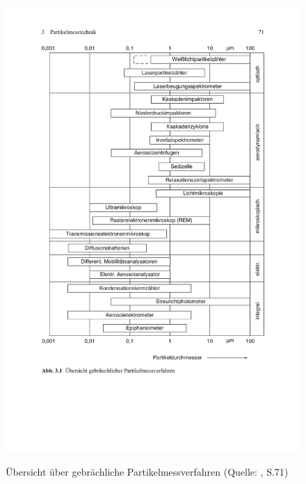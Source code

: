\begin{figure}[H]
	\myfloatalign
	{\includegraphics[width=.9\linewidth]{gfx/requirements/partikelmessverfahren.pdf}} \quad
	\caption[\"{U}bersicht \"{u}ber gebr\"{a}chliche Partikelmessverfahren (Quelle: \cite{reinraumtechnik}, S.71)]
	{\"{U}bersicht \"{u}ber gebr\"{a}chliche Partikelmessverfahren (Quelle: \cite{reinraumtechnik}, S.71)}
	\label{fig:verfahren}
\end{figure}

